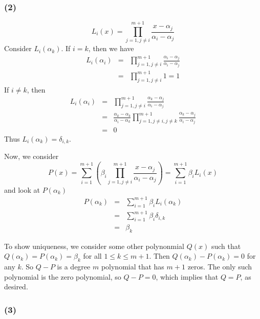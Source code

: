\documentclass{article}
\begin{document}
\subsubsection{(2)}
\[L_i(x) = \prod_{j=1, j \neq i}^{m+1}\frac{x-\alpha_j}{\alpha_i-\alpha_j}\]
Consider $L_i(\alpha_k)$. If $i = k$, then we have 
\begin{eqnarray*}
L_i(\alpha_i) 
&=& \prod_{j=1, j \neq i}^{m+1}\frac{\alpha_i-\alpha_j}{\alpha_i-\alpha_j}\\
&=& \prod_{j=1, j \neq i}^{m+1}1 = 1
\end{eqnarray*}
If $i \neq k$, then 
\begin{eqnarray*}
L_i(\alpha_i) 
&=& \prod_{j=1, j \neq i}^{m+1}\frac{\alpha_k-\alpha_j}{\alpha_i-\alpha_j}\\
&=& \frac{\alpha_k-\alpha_k}{\alpha_i-\alpha_k}\prod_{j=1, j \neq i, j \neq
k}^{m+1}\frac{\alpha_k-\alpha_j}{\alpha_i-\alpha_j} \\
&=& 0
\end{eqnarray*}
Thus $L_i(\alpha_k) = \delta_{i,k}$.
\medskip

Now, we consider
\[P(x) = \sum_{i=1}^{m+1}
    \left(\beta_i \prod_{j=1, j \neq
    i}^{m+1}\frac{x-\alpha_j}{\alpha_i-\alpha_j}\right)
     = \sum_{i=1}^{m+1} \beta_i L_i(x)
    \]
and look at $P(\alpha_k)$
\begin{eqnarray*}
P(\alpha_k) &=& \sum_{i=1}^{m+1} \beta_i L_i(\alpha_k) \\
&=& \sum_{i=1}^{m+1} \beta_i \delta_{i,k}\\
&=& \beta_k
\end{eqnarray*}

To show uniqueness, we consider some other polynonmial $Q(x)$ such that
$Q(\alpha_k) = P(\alpha_k) = \beta_k$ for all $1 \leq k \leq m+1$.
Then $Q(\alpha_k) - P(\alpha_k) = 0$ for any $k$.
So $Q - P$ is a degree $m$ polynomial that has $m+1$ zeros. 
The only such polynomial is the zero polynomial, so $Q - P = 0$, which implies
that $Q = P$, as desired.

\subsubsection{(3)}


\end{document}
